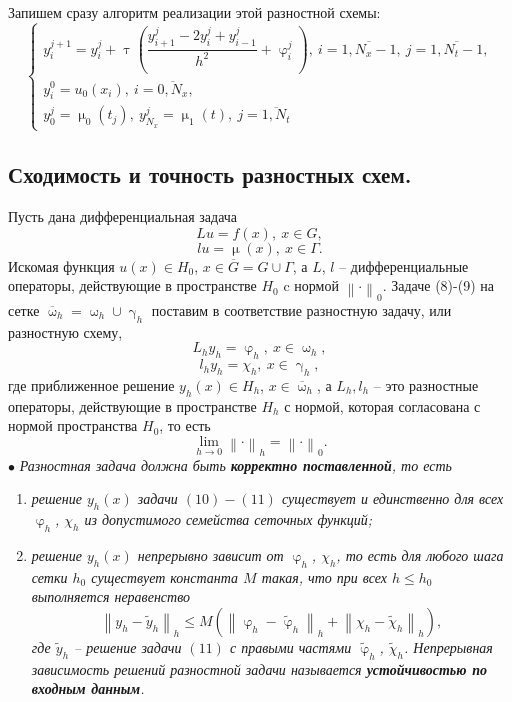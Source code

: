 \documentclass[a4paper, 12pt]{report}
\numberwithin{equation}{section}
\newcommand{\ol}{\overline}
\renewcommand{\leq}{\leqslant}
\renewcommand{\gamma}{\upgamma}
\renewcommand{\varphi}{\upvarphi}
\renewcommand{\tau}{\uptau}
\renewcommand{\mu}{\upmu}
\renewcommand{\omega}{\upomega}
\newcommand\Norm[1]{\left\| #1 \right\|}
\begin{document}
Запишем сразу алгоритм реализации этой разностной схемы:
\begin{equation}
\begin{cases}
y_i^{j+1} = y_i^j + \tau \left(\dfrac{y_{i+1}^j - 2y_i^j + y_{i-1}^j}{h^2} + \varphi_i^j\right),\ i=\ol{1, N_x-1},\ j=\ol{1, N_t-1},\\
y_i^0 = u_0(x_i),\ i=\ol{0,N_x},\\
y_0^j = \mu_0(t_j),\ y_{N_x}^j = \mu_1(t),\ j=\ol{1, N_t}
\end{cases}
\end{equation}
\subsection{Сходимость и точность разностных схем.}
Пусть дана дифференциальная задача 
\begin{equation}
Lu = f(x),\ x \in G,
\end{equation}
\begin{equation}
lu = \mu(x),\ x \in \Gamma.
\end{equation}
Искомая функция $u(x) \in H_0$, $x \in \ol G = G \cup \Gamma$, а $L$, $l$ -- дифференциальные операторы, действующие в пространстве $H_0$ c нормой $\Norm{\cdot}_0$.
Задаче (8)-(9) на сетке $\ol\omega_h = \omega_h \cup \gamma_h$ поставим в соответствие разностную задачу, или разностную схему,
\begin{equation}
L_h y_h = \varphi_h,\ x \in \omega_h,
\end{equation}
\begin{equation}
l_h y_h = \chi _h,\ x \in \gamma_h,
\end{equation}
где приближенное решение $y_h(x) \in H_h$, $x \in \ol\omega_h$, а $L_h, l_h$ -- это разностные операторы, действующие в пространстве $H_h$ с нормой, которая согласована с нормой пространства $H_0$, то есть
$$\lim\limits_{h \to 0}\Norm{\cdot}_h = \Norm{\cdot}_0.$$
$\bullet$ \textit{Разностная задача должна быть \textbf{корректно поставленной}, то есть}
\begin{enumerate}
	\item \textit{решение $y_h(x)$ задачи $(10)-(11)$ существует и единственно для всех $\varphi_h$, $\chi_h$ из допустимого семейства сеточных функций;}
	\item \textit{решение $y_h(x)$ непрерывно зависит от $\varphi_h$, $\chi_h$, то есть для любого шага сетки $h_0$ существует константа $M$ такая, что при всех $h \leq h_0$ выполняется неравенство $$\Norm{y_h-\widetilde{y}_h}_h \leq M\left(\Norm{\varphi_h - \widetilde{\varphi}_h}_h + \Norm{\chi_h - \widetilde{\chi}_h}_h\right),$$
	где $\widetilde{y}_h$ -- решение задачи $(11)$ с правыми частями $\widetilde{\varphi}_h$, $\widetilde{\chi}_h$. Непрерывная зависимость решений разностной задачи называется \textbf{устойчивостью по входным данным}.}
\end{enumerate} 
\end{document}

